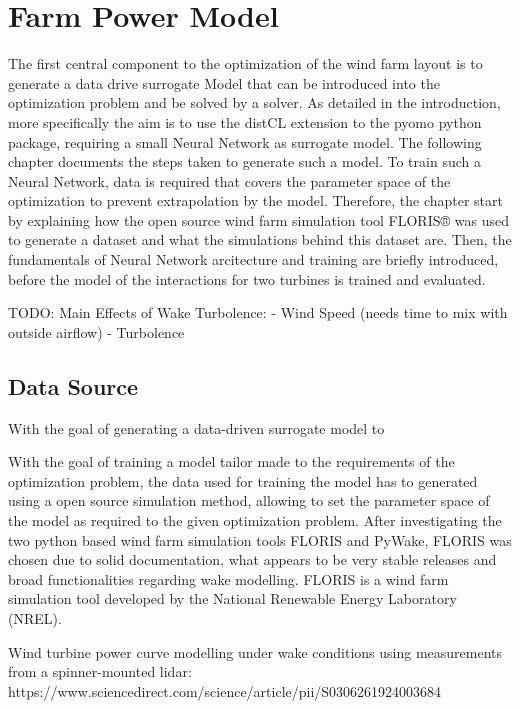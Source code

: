 
\chapter{Farm Power Model}\label{chapter:power_model}

The first central component to the optimization of the wind farm layout is to generate a data drive surrogate Model that can be introduced into the optimization problem and be solved by a solver. As detailed in the introduction, more specifically the aim is to use the distCL extension to the pyomo python package, requiring a small Neural Network as surrogate model. The following chapter documents the steps taken to generate such a model. To train such a Neural Network, data is required that covers the parameter space of the optimization to prevent extrapolation by the model. Therefore, the chapter start by explaining how the open source wind farm simulation tool FLORIS® was used to generate a dataset and what the simulations behind this dataset are. Then, the fundamentals of Neural Network arcitecture and training are briefly introduced, before the model of the interactions for two turbines is trained and evaluated.

TODO: 
Main Effects of Wake Turbolence: 
- Wind Speed (needs time to mix with outside airflow)
- Turbolence

\section{Data Source}

With the goal of generating a data-driven surrogate model to 


With the goal of training a model tailor made to the requirements of the optimization problem, the data used for training the model has to generated using a open source simulation method, allowing to set the parameter space of the model as required to the given optimization problem. After investigating the two python based wind farm simulation tools FLORIS and PyWake, FLORIS was chosen due to solid documentation, what appears to be very stable releases and broad functionalities regarding wake modelling. FLORIS is a wind farm simulation tool developed by the National Renewable Energy Laboratory (NREL).



Wind turbine power curve modelling under wake conditions using measurements from a spinner-mounted lidar:
https://www.sciencedirect.com/science/article/pii/S0306261924003684

